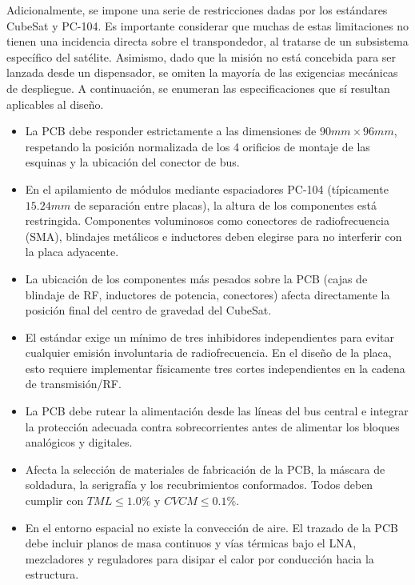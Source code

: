\documentclass[11pt,a4paper,twoside]{report}
\begin{document}
	Adicionalmente, se impone una serie de restricciones dadas por los estándares CubeSat y PC-104. Es importante considerar que muchas de estas limitaciones no tienen una incidencia directa sobre el transpondedor, al tratarse de un subsistema específico del satélite. Asimismo, dado que la misión no está concebida para ser lanzada desde un dispensador, se omiten la mayoría de las exigencias mecánicas de despliegue. A continuación, se enumeran las especificaciones que sí resultan aplicables al diseño.
	\begin{itemize}
	\item La PCB debe responder estrictamente a las dimensiones de $90mm \times 96mm$, respetando la posición normalizada de los 4 orificios de montaje de las esquinas y la ubicación del conector de bus.
	
	\item En el apilamiento de módulos mediante espaciadores PC-104 (típicamente $15.24mm$ de separación entre placas), la altura de los componentes está restringida. Componentes voluminosos como conectores de radiofrecuencia (SMA), blindajes metálicos e inductores deben elegirse para no interferir con la placa adyacente.
	
    \item La ubicación de los componentes más pesados sobre la PCB (cajas de blindaje de RF, inductores de potencia, conectores) afecta directamente la posición final del centro de gravedad del CubeSat.
    
    \item El estándar exige un mínimo de tres inhibidores independientes para evitar cualquier emisión involuntaria de radiofrecuencia. En el diseño de la placa, esto requiere implementar físicamente tres cortes independientes en la cadena de transmisión/RF. 
    
    \item La PCB debe rutear la alimentación desde las líneas del bus central e integrar la protección adecuada contra sobrecorrientes antes de alimentar los bloques analógicos y digitales.
    
    \item Afecta la selección de materiales de fabricación de la PCB, la máscara de soldadura, la serigrafía y los recubrimientos conformados. Todos deben cumplir con $TML \le 1.0\%$ y $CVCM \le 0.1\%$.
    
    \item En el entorno espacial no existe la convección de aire. El trazado de la PCB debe incluir planos de masa continuos y vías térmicas bajo el LNA, mezcladores y reguladores para disipar el calor por conducción hacia la estructura.
    

\end{itemize}
\end{document}
